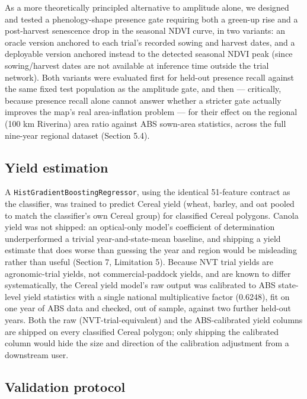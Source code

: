As a more theoretically principled alternative to amplitude alone, we designed and tested a phenology-shape presence gate requiring both a green-up rise and a post-harvest senescence drop in the seasonal NDVI curve, in two variants: an oracle version anchored to each trial's recorded sowing and harvest dates, and a deployable version anchored instead to the detected seasonal NDVI peak (since sowing/harvest dates are not available at inference time outside the trial network). Both variants were evaluated first for held-out presence recall against the same fixed test population as the amplitude gate, and then --- critically, because presence recall alone cannot answer whether a stricter gate actually improves the map's real area-inflation problem --- for their effect on the regional (100 km Riverina) area ratio against ABS sown-area statistics, across the full nine-year regional dataset (Section 5.4).

\subsection{Yield estimation}\label{yield-estimation}

A \texttt{HistGradientBoostingRegressor}, using the identical 51-feature contract as the classifier, was trained to predict Cereal yield (wheat, barley, and oat pooled to match the classifier's own Cereal group) for classified Cereal polygons. Canola yield was not shipped: an optical-only model's coefficient of determination underperformed a trivial year-and-state-mean baseline, and shipping a yield estimate that does worse than guessing the year and region would be misleading rather than useful (Section 7, Limitation 5). Because NVT trial yields are agronomic-trial yields, not commercial-paddock yields, and are known to differ systematically, the Cereal yield model's raw output was calibrated to ABS state-level yield statistics with a single national multiplicative factor (0.6248), fit on one year of ABS data and checked, out of sample, against two further held-out years. Both the raw (NVT-trial-equivalent) and the ABS-calibrated yield columns are shipped on every classified Cereal polygon; only shipping the calibrated column would hide the size and direction of the calibration adjustment from a downstream user.

\subsection{Validation protocol}\label{validation-protocol}


